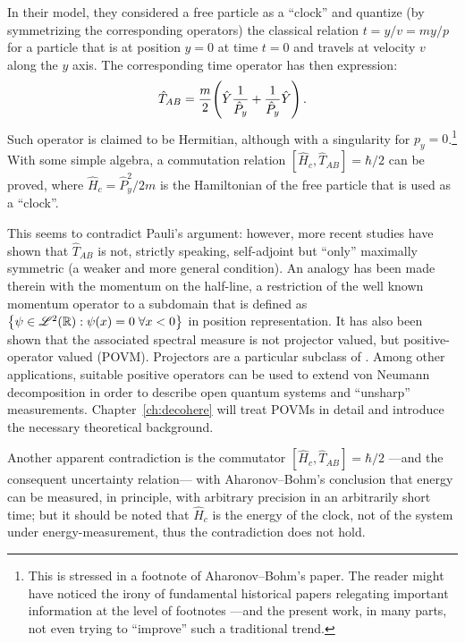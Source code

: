 In their model, they considered a free particle as a ``clock''
and quantize (by symmetrizing the corresponding operators)
the classical relation
$t = y / v = m y / p$
for a particle that is at position $y = 0$ at time $t = 0$ and travels at velocity $v$ along the $y$ axis.
The corresponding time operator has then expression:
\begin{equation}
  \hat{T}_{AB} = \frac{m}{2} \qty( \hat{Y} \frac{1}{\hat{P}_y} + \frac{1}{\hat{P}_y} \hat{Y} ) \,\text{.}
\end{equation}
Such operator is claimed to be Hermitian, although with a singularity for $p_{y} = 0$.\footnote{
  This is stressed in a footnote of Aharonov--Bohm's paper.
  The reader might have noticed the irony of fundamental historical papers
  relegating important information at the level of footnotes
  ---and the present work, in many parts, not even trying to ``improve'' such a traditional trend.
}
With some simple algebra, a commutation relation $[\hat{H}_{c}, \hat{T}_{AB}] = \hbar/2$
can be proved, where $\hat{H}_c = \hat{P}_y^2/2m$ is the Hamiltonian of the free particle that is used as a ``clock''.

This seems to contradict Pauli's argument: however, more recent studies
\parencite{MugaAB98, MugaAB99, MugaAB99Err}
have shown that
$\hat{T}_{AB}$ is not, strictly speaking, self-adjoint but ``only'' maximally symmetric
(a weaker and more general condition).
An analogy has been made therein with the momentum on the half-line,
a restriction of the well known momentum operator to a subdomain
that is defined as
$\qty{\psi \in \mathcal{L}^2(\mathbb{R}): \psi(x) = 0 \; \forall x < 0}$ in position representation.
It has also been shown that the associated spectral measure is not projector valued, but
positive-operator valued (POVM). Projectors are a particular subclass of .
Among other applications, suitable positive operators can be used to extend von Neumann decomposition
in order to describe
open quantum systems and ``unsharp'' measurements.
Chapter~\ref{ch:decohere} will treat POVMs in detail and introduce the necessary
theoretical background.

Another apparent contradiction is the commutator $[\hat{H}_{c}, \hat{T}_{AB}] = \hbar/2$
---and the consequent uncertainty relation---
with Aharonov--Bohm's conclusion that
energy can be measured, in principle, with arbitrary precision in an arbitrarily short time;
but it should be noted that $\hat{H}_{c}$ is the energy of the clock, not of the system under energy-measurement,
thus the contradiction does not hold.

